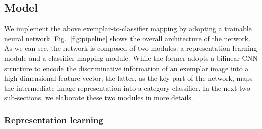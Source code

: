 \documentclass[10pt,twocolumn,letterpaper]{article}
\begin{document}
\subsection{Model}

We implement the above exemplar-to-classifier mapping by adopting a trainable neural network. Fig.~\ref{fig:pipeline} shows the overall architecture of the network. As we can see, the network is composed of two modules: a representation learning module and a classifier mapping module. While the former adopts a bilinear CNN structure to encode the discriminative information of an exemplar image into a high-dimensional feature vector, the latter, as the key part of the network, maps the intermediate image representation into a category classifier. In the next two sub-sections, we elaborate these two modules in more details.

\begin{figure*}[t!]
\caption{Overview structure of our proposed FSFG model. On the left, it is the first component (the bilinear pooling module) for representation learning. On the right, the second component (the classifier mapping module) mapps the intermediate image features into the category classifiers.}
\label{fig:pipeline}
\end{figure*}

\subsubsection{Representation learning}\label{sec:representation}
\end{document}
